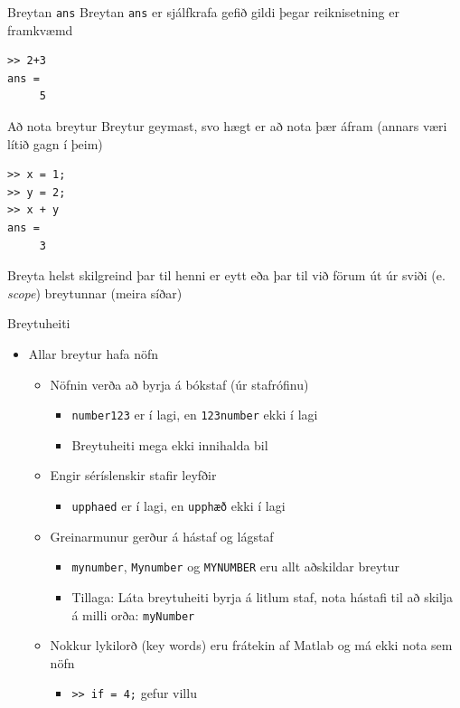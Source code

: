 \documentclass[handout]{beamer}
\begin{document}
\begin{frame}[fragile]{Breytan \texttt{ans}}
Breytan \texttt{ans} er sjálfkrafa gefið gildi þegar reiknisetning er framkvæmd 
\begin{verbatim}
>> 2+3
ans = 
     5
\end{verbatim}
\end{frame}

\begin{frame}[fragile]{Að nota breytur}
Breytur geymast, svo hægt er að nota þær áfram (annars væri lítið gagn í þeim)
\begin{verbatim}
>> x = 1;
>> y = 2;
>> x + y
ans =
     3
\end{verbatim}
Breyta helst skilgreind þar til henni er eytt eða þar til við förum út úr sviði (e. \emph{scope}) breytunnar (meira síðar)
\end{frame}

\begin{frame}{Breytuheiti}
\begin{itemize}
 \item Allar breytur hafa nöfn
 \begin{itemize}
  \item Nöfnin verða að byrja á bókstaf (úr stafrófinu)
  \begin{itemize}
   \item \texttt{number123} er í lagi, en  \texttt{123number}  ekki í lagi
   \item Breytuheiti mega ekki innihalda bil
  \end{itemize}
  \item Engir séríslenskir stafir leyfðir
  \begin{itemize}
   \item \texttt{upphaed}  er í lagi, en  \texttt{upphæð}  ekki í lagi
  \end{itemize}
  \item Greinarmunur gerður á hástaf og lágstaf
  \begin{itemize}
   \item \texttt{mynumber}, \texttt{Mynumber} og \texttt{MYNUMBER} eru allt aðskildar breytur
   \item Tillaga: Láta breytuheiti byrja á litlum staf, nota hástafi til að skilja á milli orða: \texttt{myNumber}
  \end{itemize}
  \item Nokkur lykilorð (key words) eru frátekin af Matlab og má ekki nota sem nöfn
  \begin{itemize}
   \item \texttt{>> if = 4;}    gefur villu
  \end{itemize}
 \end{itemize}
\end{itemize}
\end{frame}
\end{document}
